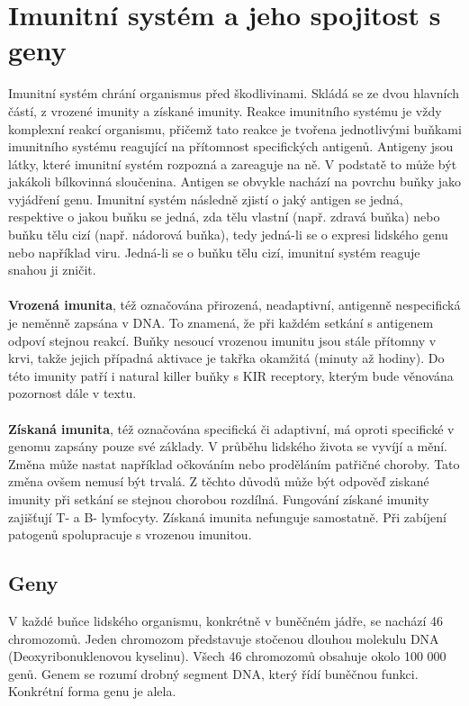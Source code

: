 \documentclass[czech,DP]{thesiskiv}
\numberwithin{equation}{section}
\begin{document}
\chapter{Imunitní systém a jeho spojitost s geny}
Imunitní systém chrání organismus před škodlivinami. Skládá se ze dvou hlavních částí, z vrozené imunity a získané imunity. Reakce imunitního systému je vždy komplexní reakcí organismu, přičemž tato reakce je tvořena jednotlivými buňkami imunitního systému reagující na přítomnost specifických antigenů. Antigeny jsou látky, které imunitní systém rozpozná a zareaguje na ně. V podstatě to může být jakákoli bílkovinná sloučenina. Antigen se obvykle nachází na povrchu buňky jako vyjádření genu. Imunitní systém následně zjistí o jaký antigen se jedná, respektive o jakou buňku se jedná, zda tělu vlastní (např. zdravá buňka) nebo buňku tělu cizí (např. nádorová buňka), tedy jedná-li se o expresi lidského genu nebo například viru. Jedná-li se o buňku tělu cizí, imunitní systém reaguje snahou ji zničit. 
\\
\\
\textbf{Vrozená imunita}, též označována přirozená, neadaptivní, antigenně nespecifická je neměnně zapsána v DNA. To znamená, že při každém setkání s antigenem odpoví stejnou reakcí. Buňky nesoucí vrozenou imunitu jsou stále přítomny v krvi, takže jejich případná aktivace je takřka okamžitá (minuty až hodiny). Do této imunity patří i natural killer buňky s KIR receptory, kterým bude věnována pozornost dále v textu. 
\\
\\
\textbf{Získaná imunita}, též označována specifická či adaptivní, má oproti specifické v genomu zapsány pouze své základy. V průběhu lidského života se vyvíjí a mění. Změna může nastat například očkováním nebo proděláním patřičné choroby. Tato změna ovšem nemusí být trvalá. Z těchto důvodů může být odpověď ziskané imunity při setkání se stejnou chorobou rozdílná. Fungování získané imunity zajišťují T- a B- lymfocyty. Získaná imunita nefunguje samostatně. Při zabíjení patogenů spolupracuje s vrozenou imunitou.

\section{Geny}
V každé buňce lidského organismu, konkrétně v buněčném jádře, se nachází 46 chromozomů. Jeden chromozom představuje stočenou dlouhou molekulu DNA (Deoxyribonuklenovou kyselinu). Všech 46 chromozomů obsahuje okolo 100 000 genů. Genem se rozumí drobný segment DNA, který řídí buněčnou funkci. Konkrétní forma genu je alela. \citep{en_smith}
\end{document}
